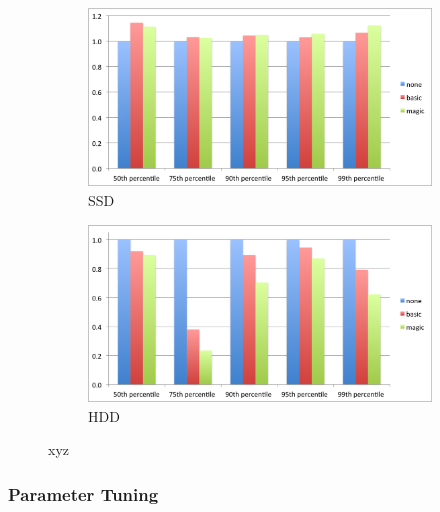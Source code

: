 \begin{figure}[t]
  \centering
  
  \begin{subfigure}[t]{\columnwidth}
      \includegraphics[width=\figw]{Figs/latency-speedup-ssd.png}
      \caption[]{SSD}
    \label{fig:volume:ssd}
  \end{subfigure}
  \begin{subfigure}[t]{\columnwidth}
      \includegraphics[width=\figw]{Figs/latency-speedup-hdd.png}
      \caption[]{HDD}
    \label{fig:volume:hdd}
  \end{subfigure}

  \caption{xyz}
  \label{fig:latency-speedup}
\end{figure}


\subsubsection{Parameter Tuning} \label{ssec:tuning}

